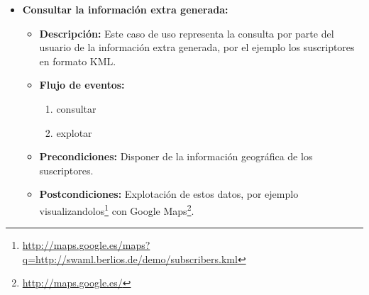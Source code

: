 \begin{itemize}
  \item \textbf{Consultar la información extra generada:}
 	\begin{itemize}
 	  \item \textbf{Descripción:} Este caso de uso representa la consulta 
		por parte del usuario de la información extra generada, por el 
		ejemplo los suscriptores en formato KML.
 	  \item \textbf{Flujo de eventos:}
		\begin{enumerate}
		 \item consultar
		 \item explotar
		\end{enumerate}
	  \item \textbf{Precondiciones:} Disponer de la información geográfica 
		de los suscriptores.
	  \item \textbf{Postcondiciones:} Explotación de estos datos, por ejemplo
		visualizandolos\footnote{\url{http://maps.google.es/maps?q=http://swaml.berlios.de/demo/subscribers.kml}}
		con Google Maps\footnote{\url{http://maps.google.es/}}.
	\end{itemize}

\end{itemize}



